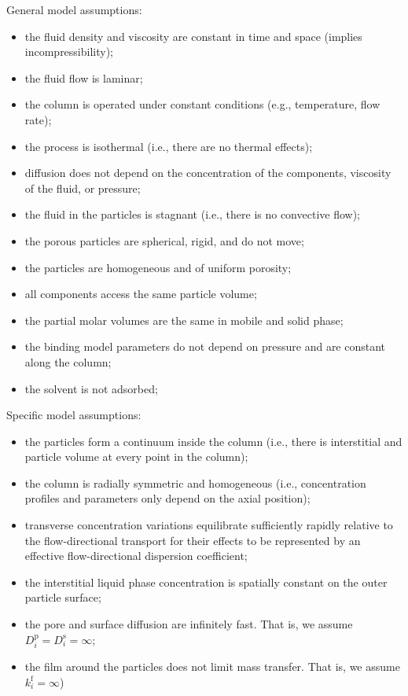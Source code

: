 \documentclass{article}
\begin{document}
General model assumptions:
\begin{itemize}
    \item the fluid density and viscosity are constant in time and space (implies incompressibility);
    \item the fluid flow is laminar;
    \item the column is operated under constant conditions (e.g., temperature, flow rate);
    \item the process is isothermal (i.e., there are no thermal effects);
    \item diffusion does not depend on the concentration of the components, viscosity of the fluid, or pressure;
    \item the fluid in the particles is stagnant (i.e., there is no convective flow);
    \item the porous particles are spherical, rigid, and do not move;
    \item the particles are homogeneous and of uniform porosity;
    \item all components access the same particle volume;
    \item the partial molar volumes are the same in mobile and solid phase;
    \item the binding model parameters do not depend on pressure and are constant along the column;
    \item the solvent is not adsorbed;
\end{itemize}

Specific model assumptions:
\begin{itemize}
    \item the particles form a continuum inside the column (i.e., there is interstitial and particle volume at every point in the column);
    \item the column is radially symmetric and homogeneous (i.e., concentration profiles and parameters only depend on the axial position);
    \item transverse concentration variations equilibrate sufficiently rapidly relative to the flow-directional transport for their effects to be represented by an effective flow-directional dispersion coefficient;
    \item the interstitial liquid phase concentration is spatially constant on the outer particle surface;
    \item the pore and surface diffusion are infinitely fast. That is, we assume $D^{\mathrm{p}}_{i} = D^{\mathrm{s}}_{i} = \infty$;
    \item the film around the particles does not limit mass transfer. That is, we assume $k^{\mathrm{f}}_{i} = \infty$)
\end{itemize}
\end{document}
